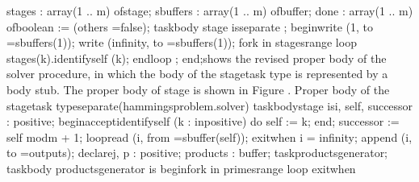    stages   : \tyxtstxbf[]array\tyxtstxendbf[] (1 .. m) %
\tyxtstxbf[]of\tyxtstxendbf[] stage;
   sbuffers : \tyxtstxbf[]array\tyxtstxendbf[] (1 .. m) %
\tyxtstxbf[]of\tyxtstxendbf[] buffer;
   done     : \tyxtstxbf[]array\tyxtstxendbf[] (1 .. m) %
\tyxtstxbf[]of\tyxtstxendbf[] boolean := (\tyxtstxbf[]others%
\tyxtstxendbf[] =\Symgt[] false);
   \tyxtstxbf[]task\tyxtstxendbf[] \tyxtstxbf[]body%
\tyxtstxendbf[] stage \tyxtstxbf[]is\tyxtstxendbf[] \tyxtstxbf[]separate%
\tyxtstxendbf[];
\tyxtstxbf[]begin\tyxtstxendbf[]
   write (1,        to =\Symgt[] sbuffers(1));
   write (infinity, to =\Symgt[] sbuffers(1));
   \tyxtstxbf[]for\tyxtstxendbf[] k \tyxtstxbf[]in%
\tyxtstxendbf[] stages\rsquo[]range \tyxtstxbf[]loop%
\tyxtstxendbf[]
      stages(k).identify\Symuns[]self (k);
   \tyxtstxbf[]end\tyxtstxendbf[] \tyxtstxbf[]loop%
\tyxtstxendbf[];
\tyxtstxbf[]end\tyxtstxendbf[];\Endcomp[]
\EndParbox[]
\FgEndblock[]
 shows the revised proper body of the \tyxffmxmono[]solver%
\tyxffmxendmono[] procedure, in which the body of the %
\tyxffmxmono[]stage\tyxffmxendmono[] task type is represented by a
body stub. The proper body of \tyxffmxmono[]stage%
\tyxffmxendmono[] is shown in Figure .
\FgBlock[]
\Parbox[]
Proper body of the %
\tyxffmxmono[]stage\tyxffmxendmono[] task type\FgEndcap[]
\Comp[]\tyxtstxbf[]separate\tyxtstxendbf[] (hammings\Symuns[]problem.solver)
\tyxtstxbf[]task\tyxtstxendbf[] \tyxtstxbf[]body\tyxtstxendbf[] stage %
\tyxtstxbf[]is\tyxtstxendbf[]
   i, self, successor : positive;
\tyxtstxbf[]begin\tyxtstxendbf[]
   \tyxtstxbf[]accept\tyxtstxendbf[] identify\Symuns[]self (k : %
\tyxtstxbf[]in\tyxtstxendbf[] positive) \tyxtstxbf[]do%
\tyxtstxendbf[]
      self := k;
   \tyxtstxbf[]end\tyxtstxendbf[];
   successor := self \tyxtstxbf[]mod\tyxtstxendbf[] m + 1;
   \tyxtstxbf[]loop\tyxtstxendbf[]
      read   (i, from =\Symgt[] sbuffer(self));
   \tyxtstxbf[]exit\tyxtstxendbf[] \tyxtstxbf[]when%
\tyxtstxendbf[] i = infinity;
      append (i, to   =\Symgt[] outputs);
      \tyxtstxbf[]declare\tyxtstxendbf[]
         j, p     : positive;
         products : buffer;
         \tyxtstxbf[]task\tyxtstxendbf[] products\Symuns[]generator;
         \tyxtstxbf[]task\tyxtstxendbf[] \tyxtstxbf[]body%
\tyxtstxendbf[] products\Symuns[]generator \tyxtstxbf[]is%
\tyxtstxendbf[]
         \tyxtstxbf[]begin\tyxtstxendbf[]
            \tyxtstxbf[]for\tyxtstxendbf[] k \tyxtstxbf[]in%
\tyxtstxendbf[] primes\rsquo[]range \tyxtstxbf[]loop%
\tyxtstxendbf[]
            \tyxtstxbf[]exit\tyxtstxendbf[] \tyxtstxbf[]when%
